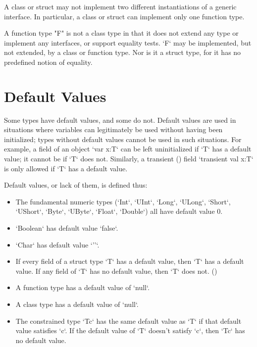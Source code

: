 \limitationx{} A class or struct may not implement two different
instantiations of a generic interface. In particular, a class or
struct can implement only one function type.


A function type \xcd"F" is not a class type in that it does not extend any
type or implement any interfaces, or support equality tests. 
\xcd`F` may be implemented, but not extended, by a class or function type. 
Nor is it a struct type, for it has no predefined notion of equality.


\section{Default Values}
\label{DefaultValues}

Some types have default values, and some do not. Default values are used in
situations where variables can legitimately be used without having been
initialized; types without default values cannot be used in such situations.
For example, a field of an object \xcd`var x:T` can be left uninitialized if
\xcd`T` has a default value; it cannot be if \xcd`T` does not. Similarly, a
transient () field \xcd`transient val x:T` is only
allowed if \xcd`T` has a default value.

Default values, or lack of them, is defined thus:
\begin{itemize}
\item The fundamental numeric types (\xcd`Int`, \xcd`UInt`,
      \xcd`Long`, \xcd`ULong`, 
  \xcd`Short`, \xcd`UShort`, \xcd`Byte`,
   \xcd`UByte`, 
      \xcd`Float`, \xcd`Double`) all have default value 0.
\item \xcd`Boolean` has default value \xcd`false`.
\item \xcd`Char` has default value \xcd`'\0'`.
\item If every field of a struct type \xcd`T` has a default value, then
      \xcd`T` has a default value.  If any field of \xcd`T` has no default
      value, then \xcd`T` does not.  ()
\item A function type has a default value of \xcd`null`.
\item A class type has a default value of \xcd`null`.
\item The constrained type \xcd`T{c}` has the same default value as \xcd`T` if
      that default value satisfies \xcd`c`.  If the default value of \xcd`T`
      doesn't satisfy \xcd`c`, then \xcd`T{c}` has no default value.
\end{itemize}

